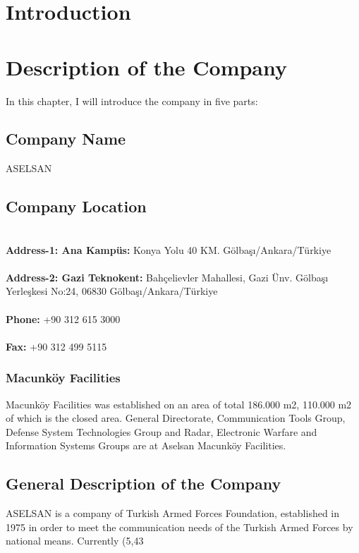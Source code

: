 \tableofcontents
\newpage



\section{Introduction}
\-
\indent 


\section{Description of the Company}
\- \indent
In this chapter, I will introduce the company in five parts:



\subsection{Company Name}
\-
\indent ASELSAN


\subsection{Company Location}
\-
\\
\textbf{ Address-1: Ana Kampüs:} Konya Yolu 40 KM. Gölbaşı/Ankara/Türkiye 
\\
\\
\textbf{ Address-2: Gazi Teknokent:} Bahçelievler Mahallesi, Gazi Ünv. Gölbaşı Yerleşkesi No:24, 06830 Gölbaşı/Ankara/Türkiye 
\\
\\
\textbf{ Phone:} +90 312 615 3000
\\
\\
\textbf{ Fax:} +90 312 499 5115

\subsubsection{Macunköy Facilities}
\- \indent

	Macunköy Facilities was established on an area of total 186.000 m2, 110.000 m2 of which is the closed area. General Directorate, Communication Tools Group, Defense System Technologies Group and Radar, Electronic Warfare and Information Systems Groups are at Aselsan Macunköy Facilities.​ 


\subsection{General Description of the Company}
\-
\indent ASELSAN is a company of Turkish Armed Forces Foundation, established in 1975 in order to meet the communication needs of the Turkish Armed Forces by national means. Currently (5,43%

